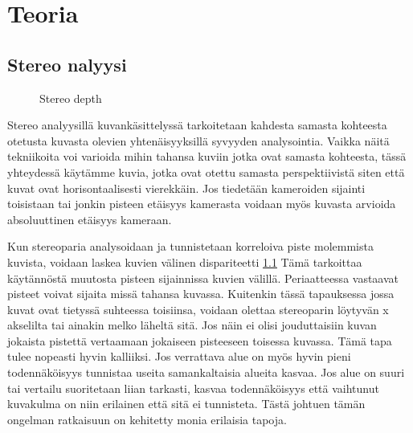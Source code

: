\chapter{Teoria}%
\label{ch:teoria}

\section{Stereo nalyysi}

\begin{figure}[h]
\centering
{}
\caption{Stereo depth}
\label{fig:stereo}
\end{figure}

Stereo analyysillä kuvankäsittelyssä tarkoitetaan kahdesta samasta kohteesta otetusta kuvasta olevien yhtenäisyyksillä syvyyden analysointia.
Vaikka näitä tekniikoita voi varioida mihin tahansa kuviin jotka ovat samasta kohteesta,
tässä yhteydessä käytämme kuvia,
jotka ovat otettu samasta perspektiivistä siten että kuvat ovat horisontaalisesti vierekkäin.
Jos tiedetään kameroiden sijainti toisistaan tai jonkin pisteen etäisyys kamerasta voidaan myös kuvasta arvioida absoluuttinen etäisyys kameraan. 

Kun stereoparia analysoidaan ja tunnistetaan korreloiva piste molemmista kuvista,
voidaan laskea kuvien välinen dispariteetti \ref{fig:stereo}
Tämä tarkoittaa käytännöstä muutosta pisteen sijainnissa kuvien välillä.
Periaatteessa vastaavat pisteet voivat sijaita missä tahansa kuvassa.
Kuitenkin tässä tapauksessa jossa kuvat ovat tietyssä suhteessa toisiinsa,
voidaan olettaa stereoparin löytyvän x akselilta tai ainakin melko läheltä sitä.
Jos näin ei olisi jouduttaisiin kuvan jokaista pistettä vertaamaan jokaiseen pisteeseen toisessa kuvassa.
Tämä tapa tulee nopeasti hyvin kalliiksi.
Jos verrattava alue on myös hyvin pieni todennäköisyys tunnistaa useita samankaltaisia alueita kasvaa.
Jos alue on suuri tai vertailu suoritetaan liian tarkasti,
kasvaa todennäköisyys että vaihtunut kuvakulma on niin erilainen että sitä ei tunnisteta.
Tästä johtuen tämän ongelman ratkaisuun on kehitetty monia erilaisia tapoja.

